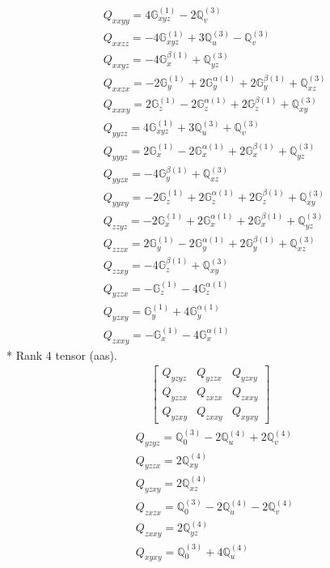 \documentclass[fleqn,8pt,landscape]{jsarticle}
\begin{document}
\begin{align*}
& Q_{xxyy} = 4 \mathbb{G}_{xyz}^{(1)} - 2 \mathbb{Q}_{v}^{(3)} \\
& Q_{xxzz} = - 4 \mathbb{G}_{xyz}^{(1)} + 3 \mathbb{Q}_{u}^{(3)} - \mathbb{Q}_{v}^{(3)} \\
& Q_{xxyz} = - 4 \mathbb{G}_{x}^{\beta(1)} + \mathbb{Q}_{yz}^{(3)} \\
& Q_{xxzx} = - 2 \mathbb{G}_{y}^{(1)} + 2 \mathbb{G}_{y}^{\alpha(1)} + 2 \mathbb{G}_{y}^{\beta(1)} + \mathbb{Q}_{xz}^{(3)} \\
& Q_{xxxy} = 2 \mathbb{G}_{z}^{(1)} - 2 \mathbb{G}_{z}^{\alpha(1)} + 2 \mathbb{G}_{z}^{\beta(1)} + \mathbb{Q}_{xy}^{(3)} \\
& Q_{yyzz} = 4 \mathbb{G}_{xyz}^{(1)} + 3 \mathbb{Q}_{u}^{(3)} + \mathbb{Q}_{v}^{(3)} \\
& Q_{yyyz} = 2 \mathbb{G}_{x}^{(1)} - 2 \mathbb{G}_{x}^{\alpha(1)} + 2 \mathbb{G}_{x}^{\beta(1)} + \mathbb{Q}_{yz}^{(3)} \\
& Q_{yyzx} = - 4 \mathbb{G}_{y}^{\beta(1)} + \mathbb{Q}_{xz}^{(3)} \\
& Q_{yyxy} = - 2 \mathbb{G}_{z}^{(1)} + 2 \mathbb{G}_{z}^{\alpha(1)} + 2 \mathbb{G}_{z}^{\beta(1)} + \mathbb{Q}_{xy}^{(3)} \\
& Q_{zzyz} = - 2 \mathbb{G}_{x}^{(1)} + 2 \mathbb{G}_{x}^{\alpha(1)} + 2 \mathbb{G}_{x}^{\beta(1)} + \mathbb{Q}_{yz}^{(3)} \\
& Q_{zzzx} = 2 \mathbb{G}_{y}^{(1)} - 2 \mathbb{G}_{y}^{\alpha(1)} + 2 \mathbb{G}_{y}^{\beta(1)} + \mathbb{Q}_{xz}^{(3)} \\
& Q_{zzxy} = - 4 \mathbb{G}_{z}^{\beta(1)} + \mathbb{Q}_{xy}^{(3)} \\
& Q_{yzzx} = - \mathbb{G}_{z}^{(1)} - 4 \mathbb{G}_{z}^{\alpha(1)} \\
& Q_{yzxy} = \mathbb{G}_{y}^{(1)} + 4 \mathbb{G}_{y}^{\alpha(1)} \\
& Q_{zxxy} = - \mathbb{G}_{x}^{(1)} - 4 \mathbb{G}_{x}^{\alpha(1)}
\end{align*}
* Rank 4 tensor (aas).
\begin{align*}
\begin{bmatrix} Q_{yzyz} & Q_{yzzx} & Q_{yzxy} \\ Q_{yzzx} & Q_{zxzx} & Q_{zxxy} \\ Q_{yzxy} & Q_{zxxy} & Q_{xyxy} \end{bmatrix}
\end{align*}
\begin{align*}
& Q_{yzyz} = \mathbb{Q}_{0}^{(3)} - 2 \mathbb{Q}_{u}^{(4)} + 2 \mathbb{Q}_{v}^{(4)} \\
& Q_{yzzx} = 2 \mathbb{Q}_{xy}^{(4)} \\
& Q_{yzxy} = 2 \mathbb{Q}_{xz}^{(4)} \\
& Q_{zxzx} = \mathbb{Q}_{0}^{(3)} - 2 \mathbb{Q}_{u}^{(4)} - 2 \mathbb{Q}_{v}^{(4)} \\
& Q_{zxxy} = 2 \mathbb{Q}_{yz}^{(4)} \\
& Q_{xyxy} = \mathbb{Q}_{0}^{(3)} + 4 \mathbb{Q}_{u}^{(4)}
\end{align*}
\end{document}
